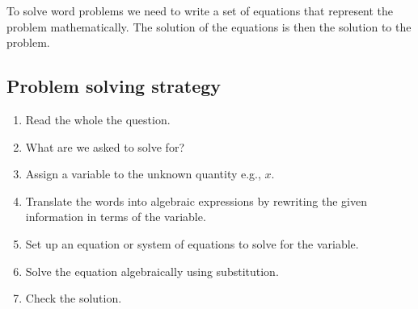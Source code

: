 
To solve word problems we need to write a set of equations that represent the problem mathematically. 
The solution of the equations is then the solution to the problem.

\subsection*{Problem solving strategy}

\begin{enumerate}[noitemsep, label=\textbf{\arabic*}. ] 
\item Read the whole the question.
\item What are we asked to solve for?
\item Assign a variable to the unknown quantity e.g., $x$.
\item  Translate the words into algebraic expressions by rewriting the given information in terms of the variable. 
\item Set up an equation or system of equations to solve for the variable.
\item Solve the equation algebraically using substitution.
\item Check the solution.
\end{enumerate}


